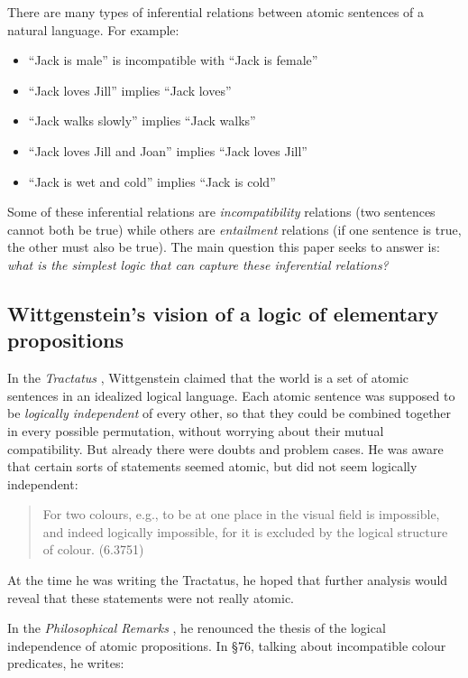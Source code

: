 There are many types of inferential relations between atomic
sentences of a natural language.  For example:

\begin{itemize}

\item ``Jack is male'' is incompatible with ``Jack is female''
\item ``Jack loves Jill'' implies ``Jack loves''
\item ``Jack walks slowly'' implies ``Jack walks''
\item ``Jack loves Jill and Joan'' implies ``Jack loves Jill''
\item ``Jack is wet and cold'' implies ``Jack is cold''

\end{itemize}

\NI Some of these inferential relations are \emph{incompatibility}
relations (two sentences cannot both be true) while others are
\emph{entailment} relations (if one sentence is true, the other must
also be true).  The main question this paper seeks to answer is:
\emph{what is the simplest logic that can capture these inferential
  relations?}

\subsection{Wittgenstein's vision of a logic of elementary propositions}

\NI In the \emph{Tractatus} \cite{wittgenstein-tractatus}, Wittgenstein
claimed that the world is a set of atomic sentences in an idealized
logical language.  Each atomic sentence was supposed to be
\emph{logically independent} of every other, so that they could be
combined together in every possible permutation, without worrying
about their mutual compatibility.
But already there were doubts and problem cases.  He was aware that
certain sorts of statements seemed atomic, but did not seem logically
independent:

\begin{quote}
  For two colours, e.g., to be at one place in the visual field is
  impossible, and indeed logically impossible, for it is excluded by
  the logical structure of colour. (6.3751)
\end{quote}

\NI At the time he was writing the Tractatus, he hoped that further
analysis would reveal that these statements were not really atomic.

In the \emph{Philosophical Remarks} \cite{wittgenstein-remarks}, he
renounced the thesis of the logical independence of atomic
propositions.  In \S 76, talking about incompatible colour predicates,
he writes:

